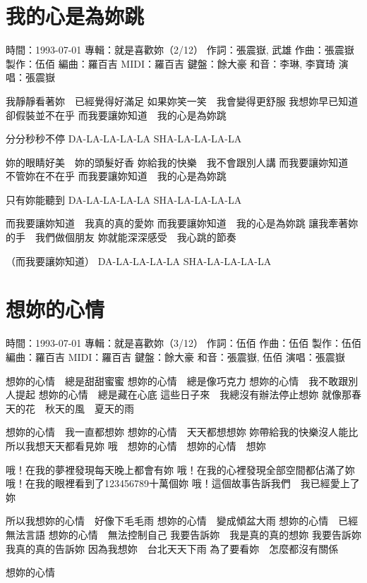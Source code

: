 \documentclass[UTF8,a4paper,oneside,twocolumn,12pt]{ctexbook}
\newcommand{\infopair}[2]{\textbullet #1：#2}
\newcommand{\zc}[1][伍佰]{\infopair{作詞}{#1}}
\newcommand{\zq}[1][伍佰]{\infopair{作曲}{#1}}
\newcommand{\bq}[1][伍佰]{\infopair{編曲}{#1}}
\newcommand{\zj}[1]{\infopair{專輯}{#1}}
\newcommand{\zz}[1]{\infopair{製作}{#1}}
\newcommand{\sj}[1]{\infopair{時間}{#1}}
\newenvironment{info}{\begin{flushleft}\kaishu
	}
	{\end{flushleft}\normalsize\yahei\par}
\newenvironment{lyric}{
	}
{}
\begin{document}
\section{我的心是為妳跳}
\begin{info}
	\sj{1993-07-01}
	\zj{就是喜歡妳（2/12）}
	\zc[張震嶽, 武雄]
	\zq[張震嶽]
	\zz{伍佰}
	\bq[羅百吉]
	\infopair{MIDI}{羅百吉}
	\infopair{鍵盤}{餘大豪}
	\infopair{和音}{李琳, 李寶琦}
	\infopair{演唱}{張震嶽}
\end{info}
\begin{lyric}
	我靜靜看著妳　已經覺得好滿足
	如果妳笑一笑　我會變得更舒服
	我想妳早已知道　卻假裝並不在乎
	而我要讓妳知道　我的心是為妳跳

	分分秒秒不停 DA-LA-LA-LA-LA SHA-LA-LA-LA-LA

	妳的眼睛好美　妳的頭髮好香
	妳給我的快樂　我不會跟別人講
	而我要讓妳知道　不管妳在不在乎
	而我要讓妳知道　我的心是為妳跳

	只有妳能聽到 DA-LA-LA-LA-LA SHA-LA-LA-LA-LA

	而我要讓妳知道　我真的真的愛妳
	而我要讓妳知道　我的心是為妳跳
	讓我牽著妳的手　我們做個朋友
	妳就能深深感受　我心跳的節奏

	（而我要讓妳知道） DA-LA-LA-LA-LA SHA-LA-LA-LA-LA
\end{lyric}

\section{想妳的心情}
\begin{info}
	\sj{1993-07-01}
	\zj{就是喜歡妳（3/12）}
	\zc
	\zq
	\zz{伍佰}
	\bq[羅百吉]
	\infopair{MIDI}{羅百吉}
	\infopair{鍵盤}{餘大豪}
	\infopair{和音}{張震嶽, 伍佰}
	\infopair{演唱}{張震嶽}
\end{info}
\begin{lyric}
	想妳的心情　總是甜甜蜜蜜
	想妳的心情　總是像巧克力
	想妳的心情　我不敢跟別人提起
	想妳的心情　總是藏在心底
	這些日子來　我總沒有辦法停止想妳
	就像那春天的花　秋天的風　夏天的雨

	想妳的心情　我一直都想妳
	想妳的心情　天天都想想妳
	妳帶給我的快樂沒人能比
	所以我想天天都看見妳
	哦　想妳的心情　想妳的心情　想妳

	哦！在我的夢裡發現每天晚上都會有妳
	哦！在我的心裡發現全部空間都佔滿了妳
	哦！在我的眼裡看到了123456789十萬個妳
	哦！這個故事告訴我們　我已經愛上了妳

	所以我想妳的心情　好像下毛毛雨
	想妳的心情　變成傾盆大雨
	想妳的心情　已經無法言語
	想妳的心情　無法控制自己
	我要告訴妳　我是真的真的想妳
	我要告訴妳　我真的真的告訴妳
	因為我想妳　台北天天下雨
	為了要看妳　怎麼都沒有關係

	想妳的心情
\end{lyric}
\end{document}
